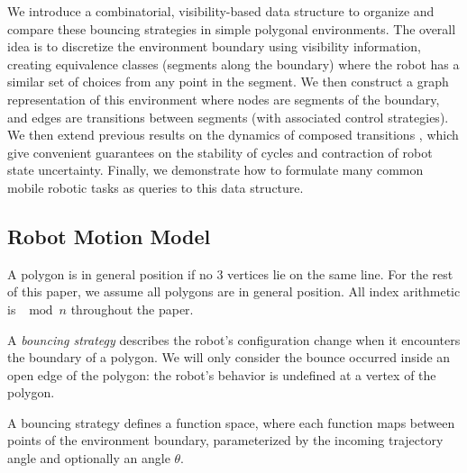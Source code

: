 \documentclass[]{article}  %
\begin{document}
We introduce a combinatorial, visibility-based data structure to organize and
compare these bouncing strategies in simple polygonal environments. The overall
idea is to discretize the environment boundary using visibility information,
creating equivalence classes (segments along the boundary) where the robot has a
similar set of choices from any point in the segment. We then construct a graph
representation of this environment where nodes are segments of the boundary, and
edges are transitions between segments (with associated control strategies). We
then extend previous results on the dynamics of composed transitions
\cite{NilBecLav17}, which give convenient guarantees on the stability of cycles
and contraction of robot state uncertainty. Finally, we demonstrate how to
formulate many common mobile robotic tasks as queries to this data structure.


\subsection{Robot Motion Model}\label{subsec:bounce_strategy}

A polygon is in general position if no $3$ vertices lie on the same line. For
the rest of this paper, we assume all polygons are in general position. All
index arithmetic is $\mod n$ throughout the paper.

A \emph{bouncing strategy} describes the robot's configuration change when it
encounters the boundary of a polygon. We will only consider the bounce occurred
inside an open edge of the polygon: the robot's behavior is undefined at a
vertex of the polygon.

A bouncing strategy defines a function space, where each function maps between 
points of the environment boundary, parameterized by the incoming trajectory
angle and optionally an angle $\theta$.
\end{document}
